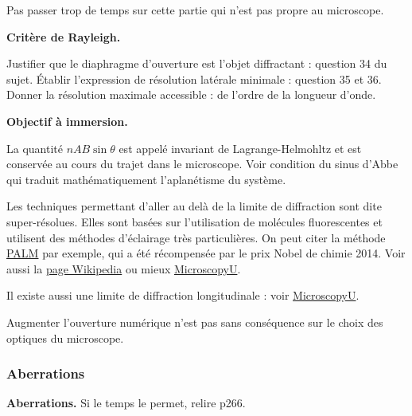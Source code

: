 Pas passer trop de temps sur cette partie qui n'est pas propre au microscope.

\begin{slide}
\textbf{Critère de Rayleigh.}
\end{slide} 

Justifier que le diaphragme d'ouverture est l'objet diffractant : question 34 du sujet.
Établir l'expression de résolution latérale minimale : question 35 et 36.
Donner la résolution maximale accessible : de l'ordre de la longueur d'onde.

\begin{slide}
\textbf{Objectif à immersion.}
\end{slide}

\begin{remarque}
La quantité $nAB\sin\theta$ est appelé invariant de Lagrange-Helmohltz et est conservée au cours du trajet dans le microscope.
Voir condition du sinus d'Abbe qui traduit mathématiquement l'aplanétisme du système.

\noindent
Les techniques permettant d'aller au delà de la limite de diffraction sont dite super-résolues.
Elles sont basées sur l'utilisation de molécules fluorescentes et utilisent des méthodes d'éclairage très particulières.
On peut citer la méthode \href{https://science.sciencemag.org/content/313/5793/1642}{PALM} par exemple, qui a été récompensée par le prix Nobel de chimie 2014.
Voir aussi la \href{https://fr.wikipedia.org/wiki/Microscopie_PALM}{page Wikipedia} ou mieux \href{https://www.microscopyu.com/techniques/super-resolution/single-molecule-super-resolution-imaging}{MicroscopyU}.

\noindent
Il existe aussi une limite de diffraction longitudinale : voir \href{https://www.microscopyu.com/techniques/super-resolution/the-diffraction-barrier-in-optical-microscopy}{MicroscopyU}.
\end{remarque}

\begin{transition}
Augmenter l'ouverture numérique n'est pas sans conséquence sur le choix des optiques du microscope.
\end{transition}

\subsubsection{Aberrations}

\begin{slide}
\textbf{Aberrations.}
Si le temps le permet, relire \cite{Hecht2002} p266.
\end{slide}

